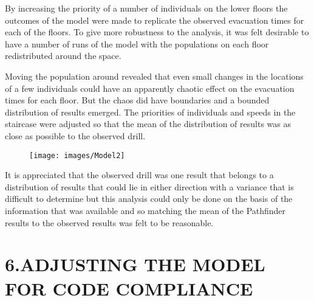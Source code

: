 \documentclass{style/llncs}
\begin{document}
\noindent{}By increasing the priority of a number of individuals on the lower floors the outcomes of the model were made to replicate the observed evacuation times for each of the floors.  To give more robustness to the analysis, it was felt desirable to have a number of runs of the model with the populations on each floor redistributed around the space.%

Moving the population around revealed that even small changes in the locations of a few individuals could have an apparently chaotic effect on the evacuation times for each floor.  But the chaos did have boundaries and a bounded distribution of results emerged.  The priorities of individuals and speeds in the staircase were adjusted so that the mean of the distribution of results was as close as possible to the observed drill.%

\begin{figure}[tbp]%
\begin{mdcenter}%

\noindent{}\texttt{[image: images/Model2]}{}%

\mdhr{}%

\noindent{}%
\end{mdcenter}\label{fig-5}%
\end{figure}%

\noindent{}It is appreciated that the observed drill was one result that belongs to a distribution of results that could lie in either direction with a variance that is difficult to determine but this analysis could only be done on the basis of the information that was available and so matching the mean of the Pathfinder results to the observed results was felt to be reasonable.%

\section{6.\hspace*{0.5em}ADJUSTING THE MODEL FOR CODE COMPLIANCE}\label{sec-adjusting-the-model-for-code-compliance}%
\end{document}
